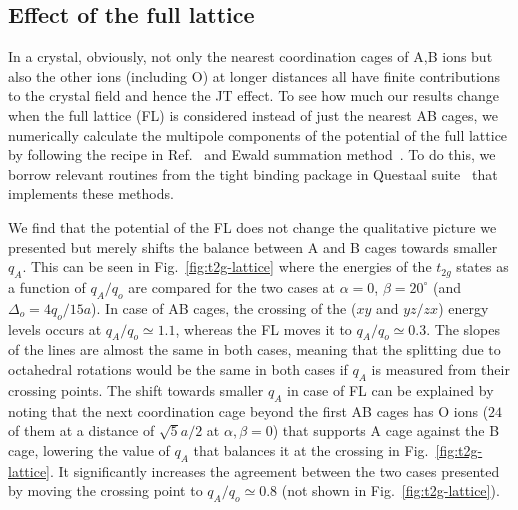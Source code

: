 \documentclass[a4paper,prb,twocolumn]{revtex4-1}  %
\newcommand{\com}[1]{}
\newcommand{\az}[1]{{\color{magenta}{#1}}} %
\begin{document}
\subsection{Effect of the full lattice}
\label{sec:FL}

In a crystal, obviously, not only the nearest coordination cages of A,B ions but also
 the other ions (including O) at longer distances
all have finite contributions to the crystal field and hence the JT effect.
To see how much our results change when 
 the full lattice (FL) is considered instead of just the nearest AB cages,
we numerically calculate the multipole components of the potential
 of the full lattice by following the recipe in Ref.~\cite{FinnisPRL98,PaxtonPRB08,PaxtonNotes}
and Ewald summation method~\cite{Ewald1921}.
To do this, 
we borrow relevant routines from the tight binding package in Questaal suite~\cite{Questaal} that implements these methods.


\com{First,
FL does not preserve the cubic symmetry of the potential and the degeneracy of the t2g manifold 
is slightly lifted at zero rotations, i.e., for a cubic structure.
However, it is insignificant and we will not discuss it further.
What's more important is that the
potential of the full lattice does not change the qualitative picture we resented
but merely shifts the balance between A and B cages towards smaller $q_A$.
}

We find that the
potential of the FL does not change the qualitative picture we presented
but merely shifts the balance between A and B cages towards smaller $q_A$.
This can be seen in Fig.~\ref{fig:t2g-lattice}
where the energies of the $t_{2g}$ states as a function of $q_A/q_o$
are compared for the two cases
at $\alpha=0$, $\beta=20^\circ$ (and $\Delta_o=4q_o/15a$).
In case of AB cages, the crossing of the 
($xy$ and $yz/zx$)
energy levels occurs 
at $q_A/q_o\simeq1.1$,
whereas the FL moves it to $q_A/q_o\simeq0.3$.
The slopes of the lines are almost the same in both cases,
meaning that the splitting due to octahedral rotations 
would be the same in both cases if $q_A$ is measured 
from their crossing points.
The shift towards smaller $q_A$ in case of FL
can be explained by noting that
the next coordination cage beyond the first AB cages
has O ions
($24$ of them at a distance of $\sqrt{5}a/2$ at $\alpha,\beta=0$) %
that supports A cage
against the B cage, lowering the value of $q_A$ that balances it
at the crossing in Fig.~\ref{fig:t2g-lattice}.
It significantly increases the agreement between the two cases presented
by moving the crossing point 
to $q_A/q_o\simeq0.8$ (not shown in Fig.~\ref{fig:t2g-lattice}).
\end{document}
